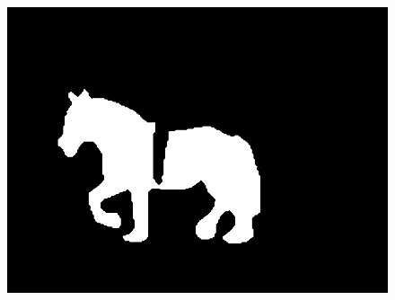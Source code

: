 \documentclass[12pt]{article}
\begin{document}
\begin{figure}[!h]
{\begin{minipage}[t]{0.15\linewidth}
  \includegraphics[width=1\linewidth]{97_gt.png}
  \end{minipage}%
  }%


\end{figure}
\end{document}
